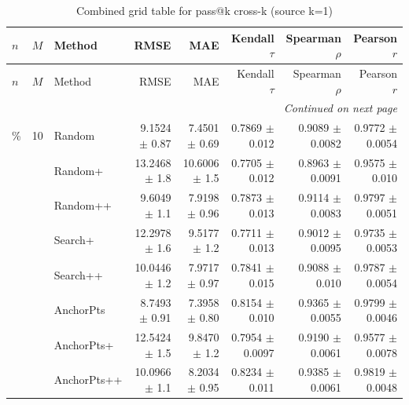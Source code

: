 \footnotesize
\setlength{\tabcolsep}{2pt}
\renewcommand{\arraystretch}{1.05}
\setlength{\LTpre}{0pt}
\setlength{\LTpost}{0pt}
\setlength{\LTleft}{\fill}
\setlength{\LTright}{\fill}
\begin{longtable}{llp{}rrrrr}
\caption{Combined grid table for pass@k cross-k (source k=1)}\label{tab:combined_grid_passk_k1}\\
\toprule
$n$ & $M$ & Method & RMSE & MAE & Kendall $\tau$ & Spearman $\rho$ & Pearson $r$ \\
\midrule
\endfirsthead
\toprule
$n$ & $M$ & Method & RMSE & MAE & Kendall $\tau$ & Spearman $\rho$ & Pearson $r$ \\
\midrule
\endhead
\midrule
\multicolumn{8}{r}{\emph{Continued on next page}} \\
\midrule
\endfoot
\bottomrule
\endlastfoot
5\% & 10 & Random & 9.1524 {\scriptsize $\pm$ 0.87} & 7.4501 {\scriptsize $\pm$ 0.69} & 0.7869 {\scriptsize $\pm$ 0.012} & 0.9089 {\scriptsize $\pm$ 0.0082} & 0.9772 {\scriptsize $\pm$ 0.0054} \\
 &  & Random+ & 13.2468 {\scriptsize $\pm$ 1.8} & 10.6006 {\scriptsize $\pm$ 1.5} & 0.7705 {\scriptsize $\pm$ 0.012} & 0.8963 {\scriptsize $\pm$ 0.0091} & 0.9575 {\scriptsize $\pm$ 0.010} \\
 &  & Random++ & 9.6049 {\scriptsize $\pm$ 1.1} & 7.9198 {\scriptsize $\pm$ 0.96} & 0.7873 {\scriptsize $\pm$ 0.013} & 0.9114 {\scriptsize $\pm$ 0.0083} & 0.9797 {\scriptsize $\pm$ 0.0051} \\
 &  & Search+ & 12.2978 {\scriptsize $\pm$ 1.6} & 9.5177 {\scriptsize $\pm$ 1.2} & 0.7711 {\scriptsize $\pm$ 0.013} & 0.9012 {\scriptsize $\pm$ 0.0095} & 0.9735 {\scriptsize $\pm$ 0.0053} \\
 &  & Search++ & 10.0446 {\scriptsize $\pm$ 1.2} & 7.9717 {\scriptsize $\pm$ 0.97} & 0.7841 {\scriptsize $\pm$ 0.015} & 0.9088 {\scriptsize $\pm$ 0.010} & 0.9787 {\scriptsize $\pm$ 0.0054} \\
 &  & AnchorPts & 8.7493 {\scriptsize $\pm$ 0.91} & 7.3958 {\scriptsize $\pm$ 0.80} & 0.8154 {\scriptsize $\pm$ 0.010} & 0.9365 {\scriptsize $\pm$ 0.0055} & 0.9799 {\scriptsize $\pm$ 0.0046} \\
 &  & AnchorPts+ & 12.5424 {\scriptsize $\pm$ 1.5} & 9.8470 {\scriptsize $\pm$ 1.2} & 0.7954 {\scriptsize $\pm$ 0.0097} & 0.9190 {\scriptsize $\pm$ 0.0061} & 0.9577 {\scriptsize $\pm$ 0.0078} \\
 &  & AnchorPts++ & 10.0966 {\scriptsize $\pm$ 1.1} & 8.2034 {\scriptsize $\pm$ 0.95} & 0.8234 {\scriptsize $\pm$ 0.011} & 0.9385 {\scriptsize $\pm$ 0.0061} & 0.9819 {\scriptsize $\pm$ 0.0048} \\

\end{longtable}
